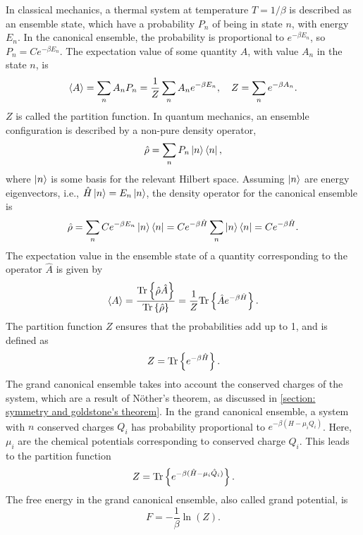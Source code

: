 In classical mechanics, a thermal system at temperature $T = 1 / \beta$ is described as an ensemble state, which have a probability $P_n$ of being in state $n$, with energy $E_n$.
In the canonical ensemble, the probability is proportional to $e^{-\beta E_n}$, so $P_n = C e^{-\beta E_n}$.
The expectation value of some quantity $A$, with value $A_n$ in the state $n$, is
%
\begin{equation*}
    \left\langle A \right\rangle 
    = \sum_n A_n P_n = \frac{1}{Z} \sum_n A_n e^{- \beta E_n}, \quad 
    Z  = \sum_n e^{-\beta A_n}.
\end{equation*}
$Z$ is called the partition function. In quantum mechanics, an ensemble configuration is described by a non-pure density operator,
%
\begin{equation*}
    \hat \rho = \sum_n P_n \ket{n}\bra{n},
\end{equation*}
where $\ket{n}$ is some basis for the relevant Hilbert space. Assuming $\ket{n}$ are energy eigenvectors, i.e., $\hat H \ket{n} = E_n \ket{n}$, the density operator for the canonical ensemble is
%
\begin{equation*}
    \hat \rho 
    = \sum_n C e^{-\beta E_n} \ket{n}\bra{n} 
    = C e^{-\beta \hat H} \sum_n \ket{n}\bra{n} 
    = C e^{-\beta \hat H}.
\end{equation*}
The expectation value in the ensemble state of a quantity corresponding to the operator $\hat A$ is given by
%
\begin{align}
    \left\langle A \right\rangle = \frac{ \text{Tr} \left\{ \hat \rho \hat A \right\} }{\text{Tr} \left\{ \hat \rho  \right\}}
    = \frac{1}{Z} \text{Tr} \left\{ \hat A e^{-\beta \hat H} \right\}.
\end{align}
%
The partition function $Z$ ensures that the probabilities add up to 1, and is defined as
%
\begin{equation}
    Z = \text{Tr} \left\{ e^{-\beta \hat H} \right\}.
\end{equation}
%
The grand canonical ensemble takes into account the conserved charges of the system, which are a result of Nöther's theorem, as discussed in 
\autoref{section: symmetry and goldstone's theorem}.
In the grand canonical ensemble, a system with $n$ conserved charges $Q_i$ has probability proportional to $e^{-\beta (H - \mu_i Q_i)}$.
Here, $\mu_i$ are the chemical potentials corresponding to conserved charge $Q_i$.
This leads to the partition function
%
\begin{equation}
    Z = \text{Tr} \left\{ e^{-\beta(\hat H - \mu_i \hat Q_i)} \right\}.
\end{equation}
%
The free energy in the grand canonical ensemble, also called grand potential, is
%
\begin{equation}
    F = -\frac{1}{\beta} \ln(Z).
\end{equation}


